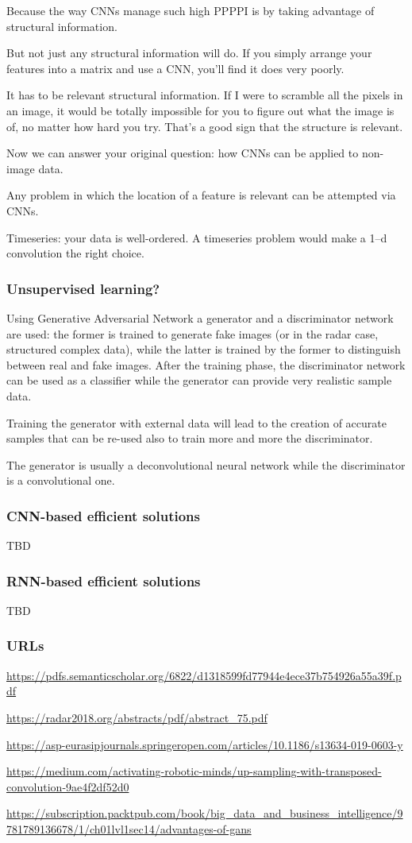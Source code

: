 \documentclass[11pt]{article}
\begin{document}
\begin{enumerate}
Because the way CNNs manage such high PPPPI is by taking advantage of structural information.

But not just any structural information will do. If you simply arrange your features into a matrix and use a CNN, you'll find it does very poorly.

It has to be relevant structural information. If I were to scramble all the pixels in an image, it would be totally impossible for you to figure out what the image is of, no matter how hard you try. That's a good sign that the structure is relevant.

Now we can answer your original question: how CNNs can be applied to non-image data.

Any problem in which the location of a feature is relevant can be attempted via CNNs.

Timeseries: your data is well-ordered. A timeseries problem would make a 1–d convolution the right choice.
\subsubsection{Unsupervised learning?}
Using Generative Adversarial Network a generator and a discriminator network are used: the former is trained to generate fake images (or in the radar case, structured complex data), while the latter is trained by the former to distinguish between real and fake images. After the training phase, the discriminator network can be used as a classifier while the generator can provide very realistic sample data.

Training the generator with external data will lead to the creation of accurate samples that can be re-used also to train more and more the discriminator.

The generator is usually a deconvolutional neural network while the discriminator is a convolutional one.
\subsubsection{CNN-based efficient solutions}
TBD
\subsubsection{RNN-based efficient solutions}
TBD    


\subsubsection{URLs}
\url{https://pdfs.semanticscholar.org/6822/d1318599fd77944e4ece37b754926a55a39f.pdf}

\url{https://radar2018.org/abstracts/pdf/abstract_75.pdf}

\url{https://asp-eurasipjournals.springeropen.com/articles/10.1186/s13634-019-0603-y}

\url{https://medium.com/activating-robotic-minds/up-sampling-with-transposed-convolution-9ae4f2df52d0}

\url{https://subscription.packtpub.com/book/big_data_and_business_intelligence/9781789136678/1/ch01lvl1sec14/advantages-of-gans}

\end{enumerate}{}
\end{document}
